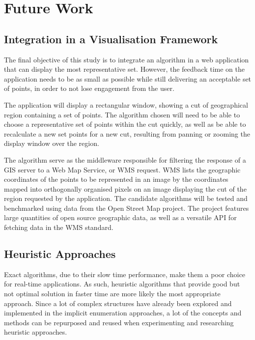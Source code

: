 \chapter{Future Work}
\label{chap:future}
\section{Integration in a Visualisation Framework}

The final objective of this study is to integrate an algorithm in a web application that can display the most representative set. However, the feedback time on the application needs to be as small as possible while still delivering an acceptable set of points, in order to not lose engagement from the user.

The application will display a rectangular window, showing a cut of geographical region containing a set of points. The algorithm chosen will need to be able to choose a representative set of points within the cut quickly, as well as be able to recalculate a new set points for a new cut, resulting from panning or zooming the display window over the region.

The algorithm serve as the middleware responsible for filtering the response of a GIS server to a Web Map Service, or WMS request. WMS lists the geographic coordinates of the points to be represented in an image by the coordinates mapped into orthogonally organised pixels on an image displaying the cut of the region requested by the application.
The candidate algorithms will be tested and benchmarked using data from the Open Street Map project. The project features large quantities of open source geographic data, as well as a versatile API for fetching data in the WMS standard.
\section{Heuristic Approaches}

Exact algorithms, due to their slow time performance, make them a poor choice for real-time applications. As such, heuristic algorithms that provide good but not optimal solution in faster time are more likely the most appropriate approach.
Since a lot of complex structures have already been explored and implemented in the implicit enumeration approaches, a lot of the concepts and methods can be repurposed and reused when experimenting and researching heuristic approaches. 

